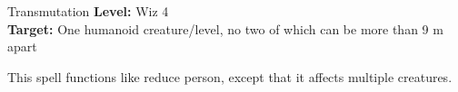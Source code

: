 {Transmutation}
{
	\textbf{Level:}
	Wiz 4\\
	\textbf{Target:}
	One humanoid creature/level, no two of which can be more than 9 m apart\\
}
{
	This spell functions like reduce person, except that it affects multiple creatures.

}
